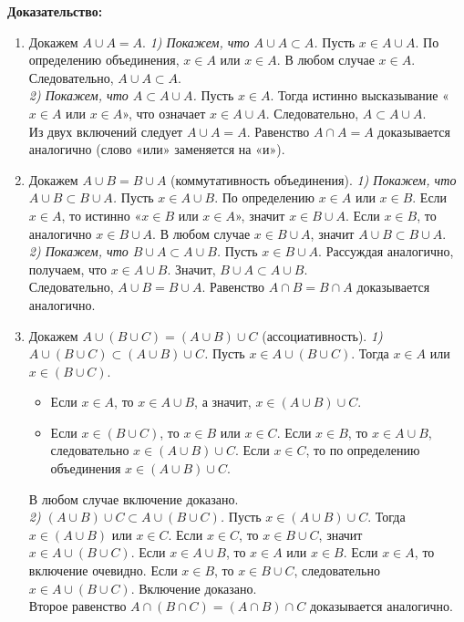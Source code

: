 \documentclass[12pt, a4paper]{article}
\begin{document}
\textbf{Доказательство:}
\begin{enumerate}[label=\alph*)]
    \item 
    Докажем \(A \cup A = A\). 
    \textit{1) Покажем, что \(A \cup A \subset A\).} Пусть \(x \in A \cup A\). По определению объединения, \(x \in A\) или \(x \in A\). В любом случае \(x \in A\). Следовательно, \(A \cup A \subset A\). \\
    \textit{2) Покажем, что \(A \subset A \cup A\).} Пусть \(x \in A\). Тогда истинно высказывание «\(x \in A\) или \(x \in A\)», что означает \(x \in A \cup A\). Следовательно, \(A \subset A \cup A\). \\
    Из двух включений следует \(A \cup A = A\). 
    Равенство \(A \cap A = A\) доказывается аналогично (слово «или» заменяется на «и»).

    \item 
    Докажем \(A \cup B = B \cup A\) (коммутативность объединения).
    \textit{1) Покажем, что \(A \cup B \subset B \cup A\).} Пусть \(x \in A \cup B\). По определению \(x \in A\) или \(x \in B\). 
    Если \(x \in A\), то истинно «\(x \in B\) или \(x \in A\)», значит \(x \in B \cup A\).
    Если \(x \in B\), то аналогично \(x \in B \cup A\).
    В любом случае \(x \in B \cup A\), значит \(A \cup B \subset B \cup A\). \\
    \textit{2) Покажем, что \(B \cup A \subset A \cup B\).} Пусть \(x \in B \cup A\). Рассуждая аналогично, получаем, что \(x \in A \cup B\).
    Значит, \(B \cup A \subset A \cup B\). \\
    Следовательно, \(A \cup B = B \cup A\).
    Равенство \(A \cap B = B \cap A\) доказывается аналогично.

    \item 
    Докажем \(A \cup (B \cup C) = (A \cup B) \cup C\) (ассоциативность).
    \textit{1) \(A \cup (B \cup C) \subset (A \cup B) \cup C\).} Пусть \(x \in A \cup (B \cup C)\). Тогда \(x \in A\) или \(x \in (B \cup C)\).
    \begin{itemize}
        \item Если \(x \in A\), то \(x \in A \cup B\), а значит, \(x \in (A \cup B) \cup C\).
        \item Если \(x \in (B \cup C)\), то \(x \in B\) или \(x \in C\). Если \(x \in B\), то \(x \in A \cup B\), следовательно \(x \in (A \cup B) \cup C\). Если \(x \in C\), то по определению объединения \(x \in (A \cup B) \cup C\).
    \end{itemize}
    В любом случае включение доказано. \\
    \textit{2) \((A \cup B) \cup C \subset A \cup (B \cup C)\).} Пусть \(x \in (A \cup B) \cup C\). Тогда \(x \in (A \cup B)\) или \(x \in C\). Если \(x \in C\), то \(x \in B \cup C\), значит \(x \in A \cup (B \cup C)\). Если \(x \in A \cup B\), то \(x \in A\) или \(x \in B\). Если \(x \in A\), то включение очевидно. Если \(x \in B\), то \(x \in B \cup C\), следовательно \(x \in A \cup (B \cup C)\).
    Включение доказано. \\
    Второе равенство \(A \cap (B \cap C) = (A \cap B) \cap C\) доказывается аналогично.


\end{enumerate}
\end{document}
